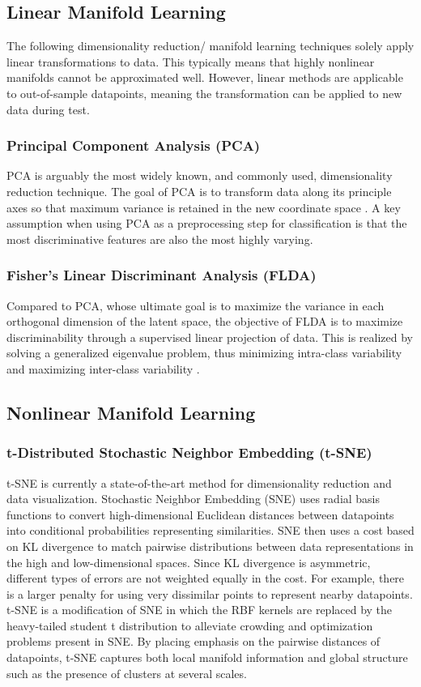 \documentclass[conference]{IEEEtran}
\begin{document}
	\subsection{Linear Manifold Learning}
	The following dimensionality reduction/ manifold learning techniques solely apply linear transformations to data.  This typically means that highly nonlinear manifolds cannot be approximated well.  However, linear methods are applicable to out-of-sample datapoints, meaning the transformation can be applied to new data during test.
	\subsubsection*{Principal Component Analysis (PCA)}  PCA is arguably the most widely known, and commonly used, dimensionality reduction technique.  The goal of PCA is to transform data along its principle axes so that maximum variance is retained in the new coordinate space \cite{Tipping1999PPCA,Murphy2012Textbook}.  A key assumption when using PCA as a preprocessing step for classification is that the most discriminative features are also the most highly varying.
	\subsubsection*{Fisher's Linear Discriminant Analysis (FLDA)}  Compared to PCA, whose ultimate goal is to maximize the variance in each orthogonal dimension of the latent space, the objective of FLDA is to maximize discriminability through a supervised linear projection of data.  This is realized by solving a generalized eigenvalue problem, thus minimizing intra-class variability and maximizing inter-class variability \cite{Murphy2012Textbook,Sugiyama2006FDASupDimRed}.
	
	
	\subsection{Nonlinear Manifold Learning}
	\subsubsection*{t-Distributed Stochastic Neighbor Embedding (t-SNE)} t-SNE is currently a state-of-the-art method for dimensionality reduction and data visualization. Stochastic Neighbor Embedding (SNE) uses radial basis functions  to convert high-dimensional Euclidean distances between datapoints into conditional probabilities representing similarities.  SNE then uses a cost based on KL divergence to match pairwise distributions between data representations in the high and low-dimensional spaces.  Since KL divergence is asymmetric, different types of errors are not weighted equally in the cost.  For example, there is a larger penalty for using very dissimilar points to represent nearby datapoints.  t-SNE is a modification of SNE in which the RBF kernels are replaced by the heavy-tailed student t distribution \cite{vanDerMaaten2008tSNE} to alleviate crowding and optimization problems present in SNE.  By placing emphasis on the pairwise distances of datapoints, t-SNE captures both local manifold information and global structure such as the presence of clusters at several scales.
\end{document}
